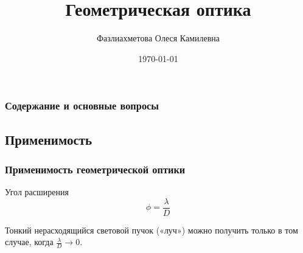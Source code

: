 \documentclass[10pt,pdf,hyperref={unicode}]{beamer}
\title{Геометрическая оптика}
\author{Фазлиахметова Олеся Камилевна}
\date{\today}
\begin{document}
	\begin{frame}
\titlepage
	\end{frame} 



	\begin{frame}
\frametitle{Содержание и основные вопросы} 
\tableofcontents
	\end{frame}



	\begin{frame}
\section{Применимость}
\frametitle{Применимость геометрической оптики} 

\begin{block}{Угол расширения}
\[\phi=\frac {\lambda}{D}\]
\end{block}
Тонкий нерасходящийся световой пучок («луч») можно получить только в том случае, когда $\frac {\lambda}{D}\rightarrow0.$
	\end{frame}
\end{document}
